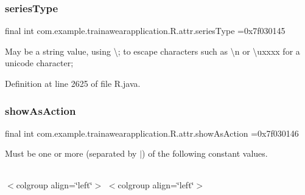 \mbox{\label{classcom_1_1example_1_1trainawearapplication_1_1_r_1_1attr_a3e7211dd9d382695a329922a7724e0f8}} 
\subsubsection{\texorpdfstring{seriesType}{seriesType}}
{\footnotesize\ttfamily final int com.\+example.\+trainawearapplication.\+R.\+attr.\+series\+Type =0x7f030145\hspace{0.3cm}{\ttfamily [static]}}

May be a string value, using \textquotesingle{}\textbackslash{};\textquotesingle{} to escape characters such as \textquotesingle{}\textbackslash{}n\textquotesingle{} or \textquotesingle{}\textbackslash{}uxxxx\textquotesingle{} for a unicode character; 

Definition at line 2625 of file R.\+java.

\mbox{\label{classcom_1_1example_1_1trainawearapplication_1_1_r_1_1attr_a7b5e700a9ea1896e028b83d047cf03a5}} 
\subsubsection{\texorpdfstring{showAsAction}{showAsAction}}
{\footnotesize\ttfamily final int com.\+example.\+trainawearapplication.\+R.\+attr.\+show\+As\+Action =0x7f030146\hspace{0.3cm}{\ttfamily [static]}}

Must be one or more (separated by \textquotesingle{}$\vert$\textquotesingle{}) of the following constant values.

\tabulinesep=1mm
\begin{longtabu}spread 0pt [c]{*{0}{|X[-1]}|}
\hline
\end{longtabu}
$<$colgroup align=\char`\"{}left\char`\"{}$>$ $<$colgroup align=\char`\"{}left\char`\"{}$>$ 

